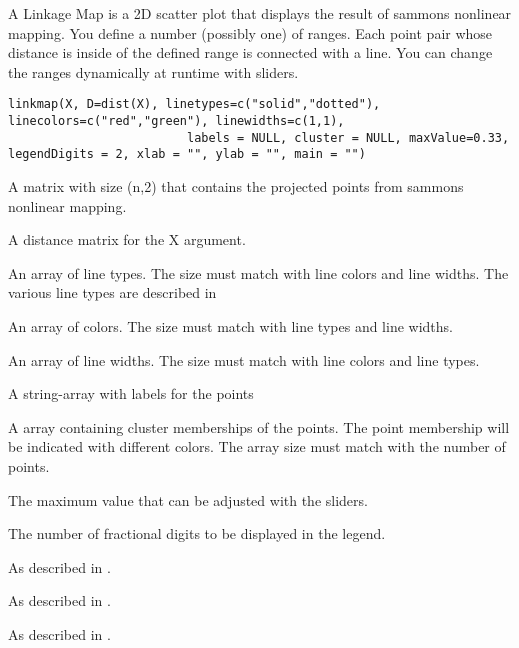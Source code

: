 \documentclass[a4paper]{book}
\begin{document}
%
\begin{Description}\relax
A Linkage Map is a 2D scatter plot that displays the result of sammons nonlinear mapping. You define a number (possibly one) of ranges. Each point pair whose distance
is inside of the defined range is connected with a line. You can change the ranges dynamically
at runtime with sliders.
\end{Description}
%
\begin{Usage}
\begin{verbatim}
linkmap(X, D=dist(X), linetypes=c("solid","dotted"), linecolors=c("red","green"), linewidths=c(1,1),
						 labels = NULL, cluster = NULL, maxValue=0.33, legendDigits = 2, xlab = "", ylab = "", main = "")
\end{verbatim}
\end{Usage}
%
\begin{Arguments}
\begin{ldescription}
\item[\code{X}] 
A matrix with size (n,2) that contains the projected points from sammons nonlinear mapping.

\item[\code{D}] 
A distance matrix for the X argument. 

\item[\code{linetypes}] 
An array of line types. The size must match with line colors and line widths.
The various line types are described in 

\item[\code{linecolors}] 
An array of colors. The size must match with line types and line widths.

\item[\code{linewidths}] 
An array of line widths. The size must match with line colors and line types.

\item[\code{labels}] 
A string-array with labels for the points

\item[\code{cluster}] 
A array containing cluster memberships of the points. The point
membership will be indicated with different colors. The array size
must match with the number of points.

\item[\code{maxValue}] 
The maximum value that can be adjusted with the sliders.

\item[\code{legendDigits}] 
The number of fractional digits to be displayed in the legend.

\item[\code{xlab}] 
As described in .

\item[\code{ylab}] 
As described in .

\item[\code{main}] 
As described in .

\end{ldescription}
\end{Arguments}
\end{document}
